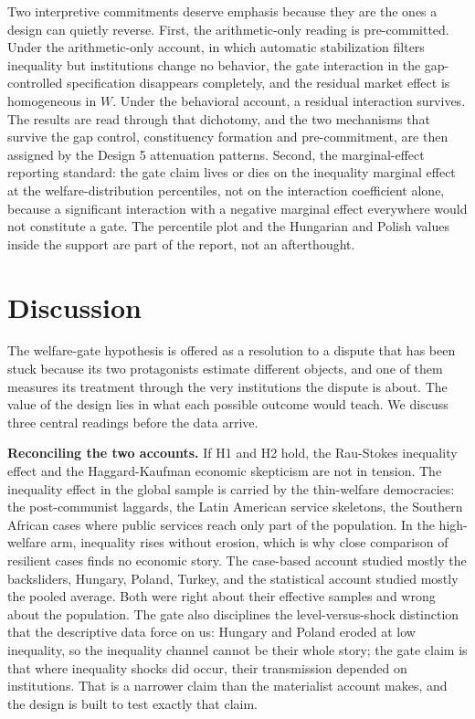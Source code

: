 Two interpretive commitments deserve emphasis because they are the ones a design can quietly reverse. First, the arithmetic-only reading is pre-committed. Under the arithmetic-only account, in which automatic stabilization filters inequality but institutions change no behavior, the gate interaction in the gap-controlled specification disappears completely, and the residual market effect is homogeneous in $W$. Under the behavioral account, a residual interaction survives. The results are read through that dichotomy, and the two mechanisms that survive the gap control, constituency formation and pre-commitment, are then assigned by the Design 5 attenuation patterns. Second, the marginal-effect reporting standard: the gate claim lives or dies on the inequality marginal effect at the welfare-distribution percentiles, not on the interaction coefficient alone, because a significant interaction with a negative marginal effect everywhere would not constitute a gate. The percentile plot and the Hungarian and Polish values inside the support are part of the report, not an afterthought.

\section{Discussion}

The welfare-gate hypothesis is offered as a resolution to a dispute that has been stuck because its two protagonists estimate different objects, and one of them measures its treatment through the very institutions the dispute is about. The value of the design lies in what each possible outcome would teach. We discuss three central readings before the data arrive.

\textbf{Reconciling the two accounts.} If H1 and H2 hold, the Rau-Stokes inequality effect \citep{RauStokes2025} and the Haggard-Kaufman economic skepticism \citep{HaggardKaufman2021} are not in tension. The inequality effect in the global sample is carried by the thin-welfare democracies: the post-communist laggards, the Latin American service skeletons, the Southern African cases where public services reach only part of the population. In the high-welfare arm, inequality rises without erosion, which is why close comparison of resilient cases finds no economic story. The case-based account studied mostly the backsliders, Hungary, Poland, Turkey, and the statistical account studied mostly the pooled average. Both were right about their effective samples and wrong about the population. The gate also disciplines the level-versus-shock distinction that the descriptive data force on us: Hungary and Poland eroded at low inequality, so the inequality channel cannot be their whole story; the gate claim is that where inequality shocks did occur, their transmission depended on institutions. That is a narrower claim than the materialist account makes, and the design is built to test exactly that claim.

